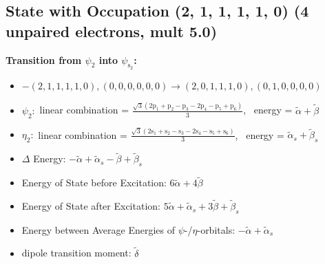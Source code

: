 \documentclass[12pt,a4paper]{article}
\begin{document}
\subsection*{State with Occupation (2, 1, 1, 1, 1, 0) (4 unpaired electrons, mult 5.0)}
        \noindent\textbf{Transition from $\psi_{2}$ into $\psi_{\text{s}_{2}}$:}
        \begin{itemize}
            \item $- (2, 1, 1, 1, 1, 0), (0, 0, 0, 0, 0, 0) \rightarrow (2, 0, 1, 1, 1, 0), (0, 1, 0, 0, 0, 0)$
        
            \item $\psi_{2}:$ linear combination = $\frac{\sqrt{3} \left(2 \text{p}_{1} + \text{p}_{2} - \text{p}_{3} - 2 \text{p}_{4} - \text{p}_{5} + \text{p}_{6}\right)}{3}$, \
            energy = $\tilde{\alpha} + \tilde{\beta}$
            
            \item $\eta_{2}:$ linear combination = $\frac{\sqrt{3} \left(2 \text{s}_{1} + \text{s}_{2} - \text{s}_{3} - 2 \text{s}_{4} - \text{s}_{5} + \text{s}_{6}\right)}{3}$, \
            energy = $\tilde{\alpha}_{s} + \tilde{\beta}_{s}$
            
                \item $\Delta$ Energy: $- \tilde{\alpha} + \tilde{\alpha}_{s} - \tilde{\beta} + \tilde{\beta}_{s}$
                \item Energy of State before Excitation: $6 \tilde{\alpha} + 4 \tilde{\beta}$
                \item Energy of State after Excitation: $5 \tilde{\alpha} + \tilde{\alpha}_{s} + 3 \tilde{\beta} + \tilde{\beta}_{s}$
                \item Energy between Average Energies of $\psi$-/$\eta$-orbitals: $- \tilde{\alpha} + \tilde{\alpha}_{s}$
            
            \item dipole transition moment: $\tilde{\delta}$
        
        \end{itemize}
        
\end{document}

